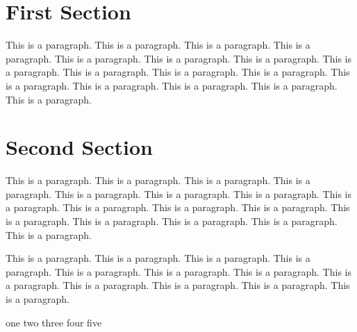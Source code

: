 \documentclass{article}
\begin{document}
\section{First Section}

This is a paragraph. This is a paragraph. This is a paragraph. This is a paragraph. 
This is a paragraph. This is a paragraph. This is a paragraph. This is a paragraph. 
This is a paragraph. This is a paragraph. This is a paragraph. This is a paragraph. 
This is a paragraph. This is a paragraph. This is a paragraph. This is a paragraph. 

\section{Second Section}

This is a paragraph. This is a paragraph. This is a paragraph. This is a paragraph. 
This is a paragraph. This is a paragraph. This is a paragraph. This is a paragraph. 
This is a paragraph. This is a paragraph. This is a paragraph. This is a paragraph. 
This is a paragraph. This is a paragraph. This is a paragraph. This is a paragraph. 

This is a paragraph. This is a paragraph. This is a paragraph. This is a paragraph. 
This is a paragraph. This is a paragraph. This is a paragraph. This is a paragraph. 
This is a paragraph. This is a paragraph. This is a paragraph. This is a paragraph. 

\begin{algorithm}[H]
    one \;%
    two \;%
    three \;%
    four \;%
    five
\end{algorithm}
\end{document}
